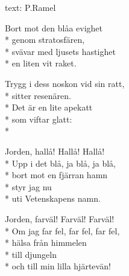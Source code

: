 \begin{SongText}[Rymdraketsvalsen]
    \begin{SongInfo}
        text: P.Ramel
    \end{SongInfo}
    \begin{SongVerse}
        Bort mot den blåa evighet\\*%
        genom stratosfären,\\*%
        svävar med ljusets hastighet\\*%
        en liten vit raket.
    \end{SongVerse}
    \begin{SongVerse}
        Trygg i dess noskon vid sin ratt,\\*%
        sitter resenären.\\*%
        Det är en lite apekatt\\*%
        som viftar glatt:\\*%
    \end{SongVerse}
    \begin{SongVerse}
        Jorden, hallå! Hallå! Hallå!\\*%
        Upp i det blå, ja blå, ja blå,\\*%
        bort mot en fjärran hamn\\*%
        styr jag nu\\*%
        uti Vetenskapens namn.
    \end{SongVerse}
    \begin{SongVerse}
        Jorden, farväl! Farväl! Farväl!\\*%
        Om jag far fel, far fel, far fel,\\*%
        hälsa från himmelen\\*%
        till djungeln\\*%
        och till min lilla hjärtevän!
    \end{SongVerse}
\end{SongText}
